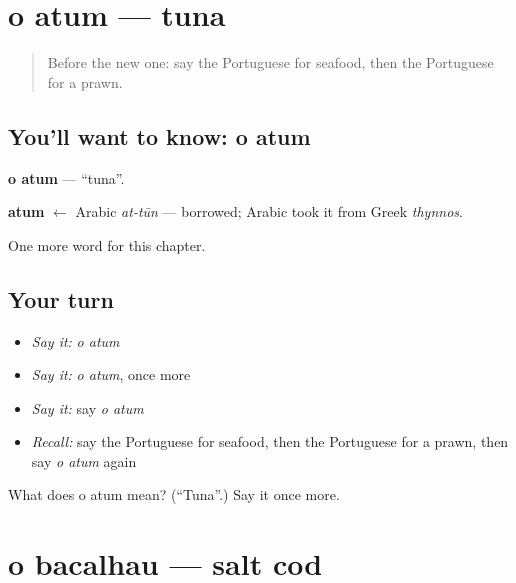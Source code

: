\section[o atum]{o atum — tuna}

\label{lesson:PT-C254-atum}



\begin{quote}
Before the new one: say the Portuguese for seafood, then the Portuguese for a prawn.
\end{quote}

\subsection*{You'll want to know: o atum}
\textbf{o atum} — \textquotedblleft{}tuna\textquotedblright{}.

\begin{cousinweb}
\textbf{atum} $\leftarrow$ Arabic \emph{at-tūn} — borrowed; Arabic took it from Greek \emph{thynnos}.
\end{cousinweb}

\begin{grammarlens}[title={What you've built}]
One more word for this chapter.
\end{grammarlens}

\subsection*{Your turn}
\begin{itemize}
\raggedright
  \item \emph{Say it:} \emph{o atum}
  \item \emph{Say it:} \emph{o atum}, once more
  \item \emph{Say it:} say \emph{o atum}
  \item \emph{Recall:} say the Portuguese for seafood, then the Portuguese for a prawn, then say \emph{o atum} again
\end{itemize}

\begin{tcolorbox}[breakable,colback=teal!4,colframe=teal!35!black,title={Before you move on}]
What does o atum mean? (\textquotedblleft{}Tuna\textquotedblright{}.) Say it once more.
\end{tcolorbox}
\section[o bacalhau]{o bacalhau — salt cod}

